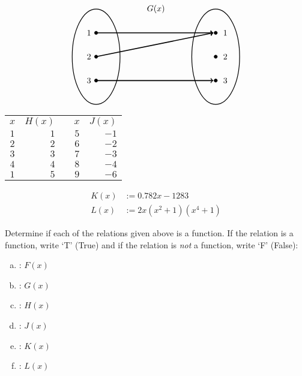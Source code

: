 \documentclass[12pt,letterpaper]{exam}
\begin{document}
\begin{questions}
\[\begin{tikzpicture}
	\tikzset{shift={(8,0)}}	
	
	\node at (2.5,2) {$G(x)$};
	
	\draw[line width=0.03cm] (0,0) circle (1 and 2);
	\draw[line width=0.03cm] (5,0) circle (1 and 2);
	
	\draw[fill=black] (0,1) circle (0.07);
	\draw[fill=black] (0,0) circle (0.07);
	\draw[fill=black] (0,-1) circle (0.07);
	
	\draw[fill=black] (5,1) circle (0.07);
	\draw[fill=black] (5,0) circle (0.07);
	\draw[fill=black] (5,-1) circle (0.07);
	
	\draw[line width=0.04cm,->] (0,1) -- (4.9,1);
	\draw[line width=0.04cm,->] (0,0) -- (4.9,1);
	\draw[line width=0.04cm,->] (0,-1) -- (4.9,-1);
	
	\node at (-0.3,1) {$1$};
	\node at (-0.3,0) {$2$};
	\node at (-0.3,-1) {$3$};
	
	\node at (5.4,1) {$1$};
	\node at (5.4,0) {$2$};
	\node at (5.4,-1) {$3$};
	\end{tikzpicture}
	\] \pspace

	\begin{minipage}[b]{0.49\textwidth}
	\centering
	\begin{tabular}{c|rcc|r}
	$x$ & $H(x)$ & \hspace{1cm} & $x$ & $J(x)$ \\ \cline{1-2} \cline{4-5}
	$1$ & $1$ & & $5$ & $-1$ \\
	$2$ & $2$ & & $6$ & $-2$ \\
	$3$ & $3$ & & $7$ & $-3$ \\
	$4$ & $4$ & & $8$ & $-4$ \\
	$1$ & $5$ & & $9$ & $-6$
	\end{tabular}
	\end{minipage}
	\begin{minipage}[b]{0.49\textwidth}
	\[
	\begin{aligned}
	K(x)&:= 0.782x - 1283 \\[0.6cm]
	L(x)&:= 2x(x^2 + 1)(x^4 + 1)
	\end{aligned}
	\]
	\end{minipage} \pvspace{0.6cm}
	
Determine if each of the relations given above is a function. If the relation is a function, write `T' (True) and if the relation is \emph{not} a function, write `F' (False): \pspace

	\begin{enumerate}[(a)]
	\item \uans{1.6cm}: $F(x)$ \pvspace{0.3cm}
	\item \uans{1.6cm}: $G(x)$ \pvspace{0.3cm}
	\item \uans{1.6cm}: $H(x)$ \pvspace{0.3cm}
	\item \uans{1.6cm}: $J(x)$ \pvspace{0.3cm}
	\item \uans{1.6cm}: $K(x)$ \pvspace{0.3cm}
	\item \uans{1.6cm}: $L(x)$
	\end{enumerate}




\end{questions}
\end{document}
